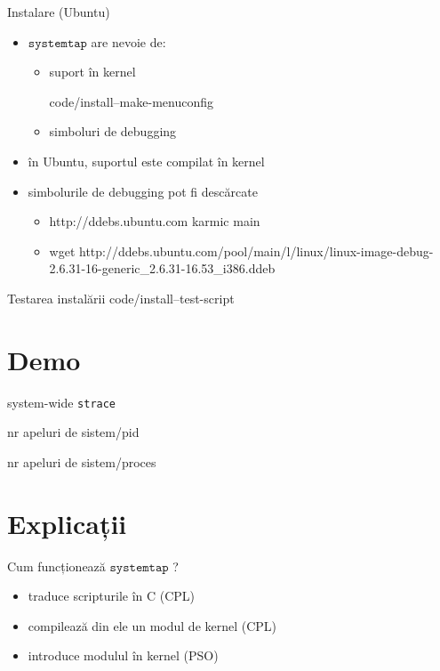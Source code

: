 \documentclass{beamer}
\newcommand{\systemtap}{$\texttt{systemtap}$ }
\begin{document}
\begin{frame}{Instalare (Ubuntu)}
  \begin{itemize}
    \item \systemtap are nevoie de:
      \begin{itemize} 
      \item suport în kernel
        \begin{beamerboxesrounded}[lower=block body,shadow=true]
          \small  {code/install--make-menuconfig}
        \end{beamerboxesrounded}
      \item simboluri de debugging
      \end{itemize}
    \item în Ubuntu, suportul este compilat în kernel
    \item simbolurile de debugging pot fi descărcate
      \begin{itemize}
      \item http://ddebs.ubuntu.com karmic main
      \item wget http://ddebs.ubuntu.com/pool/main/l/linux/linux-image-debug-2.6.31-16-generic\_2.6.31-16.53\_i386.ddeb
      \end{itemize}
  \end{itemize}
\end{frame}


\begin{frame}{Testarea instalării}
   {code/install--test-script}
\end{frame}


\section{Demo}

\begin{frame}{system-wide \texttt{strace}}
  \small 
\end{frame}

\begin{frame}{nr apeluri de sistem/pid}
  \small 
\end{frame}

\begin{frame}{nr apeluri de sistem/proces}
  \small 
\end{frame}

\section{Explicații}
\begin{frame}{Cum funcționează \systemtap?}
  \begin{itemize}
  \item traduce scripturile în C (CPL)
  \item compilează din ele un modul de kernel (CPL)
  \item introduce modulul în kernel (PSO)
  \end {itemize}
\end{frame}
\end{document}
